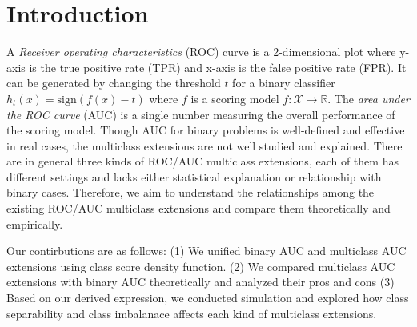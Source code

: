\documentclass[twoside,11pt]{article}
\renewcommand{\>}{{\rightarrow}}
\newcommand{\1}{{\mathbf 1}}
\newcommand{\0}{{\mathbf 0}}
\begin{document}
\section{Introduction}
A {\em Receiver operating characteristics} (ROC) curve is a 2-dimensional plot where y-axis is the true positive rate (TPR) and x-axis is the false positive rate (FPR). It can be generated by changing the threshold $t$ for a binary classifier $h_t(x) = \text{sign}(f(x) - t)$ where $f$ is a scoring model $f: \mathcal{X}\rightarrow \mathbb{R}$.
The {\em area under the ROC curve} (AUC) is a single number measuring the overall performance of the scoring model. %
Though AUC for binary problems is well-defined and effective in real cases, the multiclass extensions are not well studied and explained.
There are in general three kinds of ROC/AUC multiclass extensions, each of them has different settings and lacks either statistical explanation or relationship with binary cases. 
Therefore, we aim to understand the relationships among the existing ROC/AUC multiclass extensions and compare them theoretically and empirically.

Our contirbutions are as follows: (1) We unified binary AUC and multiclass AUC extensions using class score density function. (2) We compared multiclass AUC extensions with binary AUC theoretically and analyzed their pros and cons (3) Based on our derived expression, we conducted simulation and explored how class separability and class imbalanace affects each kind of multiclass extensions.
\end{document}
